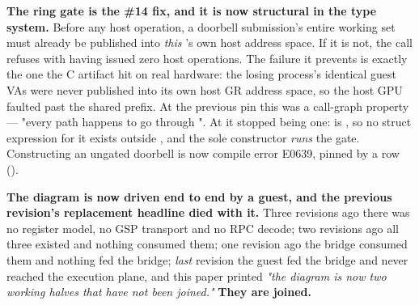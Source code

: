 \documentclass[10.5pt]{article}
\begin{document}
\textbf{The ring gate is the \#14 fix, and it is now structural in the type system.} Before any
host operation, a doorbell submission's entire working set must already be published into
\emph{this} 's own host address space. If it is not, the call refuses with
 having issued zero host operations. The failure it prevents is exactly the one the C
artifact hit on real hardware: the losing process's identical guest VAs were never published into
its own host GR address space, so the host GPU faulted past the shared prefix. At the previous pin
this was a call-graph property — "every path happens to go through ". At
 it stopped being one:  is , so no
struct expression for it exists outside , and the sole constructor
 \emph{runs} the gate. Constructing an ungated doorbell is now
compile error E0639, pinned by a  row ().

\textbf{The diagram is now driven end to end by a guest, and the previous revision's replacement
headline died with it.} Three revisions ago there was no register model, no GSP transport and no
RPC decode; two revisions ago all three existed and nothing consumed them; one revision ago the
bridge consumed them and nothing fed the bridge; \emph{last} revision the guest fed the bridge and
never reached the execution plane, and this paper printed \emph{"the diagram is now two working
halves that have not been joined."} \textbf{They are joined.}
\end{document}
